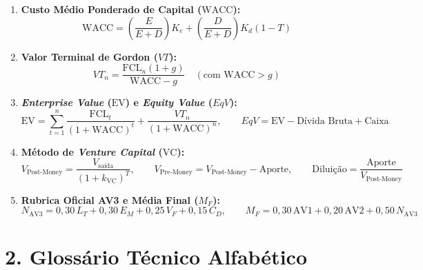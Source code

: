 \begin{boxFormula}
\begin{enumerate}[leftmargin=1.5em, itemsep=4pt, resume]
  \item \textbf{Custo Médio Ponderado de Capital ($\text{WACC}$):}
  \[
  \text{WACC} = \left(\frac{E}{E + D}\right)K_e + \left(\frac{D}{E + D}\right)K_d(1 - T)
  \]

  \item \textbf{Valor Terminal de Gordon ($VT$):}
  \[
  VT_n = \frac{\text{FCL}_n(1 + g)}{\text{WACC} - g} \quad (\text{com } \text{WACC} > g)
  \]

  \item \textbf{\textit{Enterprise Value} ($\text{EV}$) e \textit{Equity Value} ($EqV$):}
  \[
  \text{EV} = \sum_{t=1}^{n} \frac{\text{FCL}_t}{(1 + \text{WACC})^t} + \frac{VT_n}{(1 + \text{WACC})^n}, \qquad EqV = \text{EV} - \text{Dívida Bruta} + \text{Caixa}
  \]

  \item \textbf{Método de \textit{Venture Capital} ($\text{VC}$):}
  \[
  V_{\text{Post-Money}} = \frac{V_{\text{saída}}}{(1 + k_{\text{VC}})^T}, \qquad V_{\text{Pre-Money}} = V_{\text{Post-Money}} - \text{Aporte}, \qquad \text{Diluição} = \frac{\text{Aporte}}{V_{\text{Post-Money}}}
  \]

  \item \textbf{Rubrica Oficial AV3 e Média Final ($M_F$):}
  \[
  N_{\text{AV3}} = 0{,}30\,L_T + 0{,}30\,E_M + 0{,}25\,V_F + 0{,}15\,C_D, \qquad M_F = 0{,}30\,\text{AV1} + 0{,}20\,\text{AV2} + 0{,}50\,N_{\text{AV3}}
  \]
\end{enumerate}
\end{boxFormula}

\section*{2. Glossário Técnico Alfabético}

